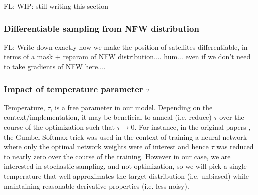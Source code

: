 \documentclass[a4paper,usenatbib]{mnras}
\newcommand{\FL}[1]{{\color{magenta}FL: #1}}
\begin{document}
\FL{WIP: still writing this section}



\subsubsection{Differentiable sampling from NFW distribution}

\FL{Write down exactly how we make the position of satellites differentiable, in terms of a mask + reparam of NFW distribution.... hum... even if we don't need to take gradients of NFW here...}.


\subsubsection{Impact of temperature parameter $\tau$}

Temperature, $\tau$, is a free parameter in our model.
Depending on the context/implementation, it may be beneficial to anneal (i.e. reduce) $\tau$ over the course of the optimization such that $\tau \rightarrow 0$. For instance, in the original papers \citep{2016arXiv161101144J,2016arXiv161100712M}, the Gumbel-Softmax trick was used in the context of training a neural network where only the optimal network weights were of interest and hence $\tau$ was reduced to nearly zero over the course of the training.
However in our case, we are interested in stochastic sampling, and not 
optimization, so we will pick a single temperature that well approximates 
the target distribution (i.e. unbiased) while maintaining reasonable 
derivative properties (i.e. less noisy). 
\end{document}
